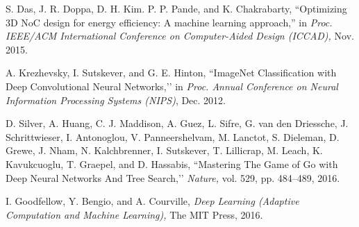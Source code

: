 \documentclass[twocolumn]{article}
\begin{document}
\begin{thebibliography}{99}
S. Das, J. R. Doppa, D. H. Kim. P. P. Pande, and K. Chakrabarty,
``Optimizing 3D NoC design for energy efficiency:
 A machine learning approach,''
in {\em Proc. IEEE/ACM International Conference on
 Computer-Aided Design (ICCAD),}
Nov. 2015.

A. Krezhevsky, I. Sutskever, and G. E. Hinton,
``ImageNet Classification with Deep Convolutional Neural Networks,’’
in {\em Proc. Annual Conference on Neural Information Processing Systems (NIPS)},
Dec. 2012.


D. Silver, A. Huang, C. J. Maddison, A. Guez, L. Sifre, G. van den Driessche,
J. Schrittwieser, I. Antonoglou, V. Panneershelvam, M. Lanctot, S. Dieleman,
D. Grewe, J. Nham, N. Kalchbrenner, I. Sutskever, T. Lillicrap, M. Leach,
K. Kavukcuoglu, T. Graepel, and D. Hassabis,
``Mastering The Game of Go with Deep Neural Networks And Tree Search,’’
{\em Nature,} vol. 529, pp. 484--489, 2016.

I. Goodfellow, Y. Bengio, and A. Courville,
{\em Deep Learning (Adaptive Computation and Machine Learning),}
The MIT Press, 2016. 

\end{thebibliography}
\end{document}
